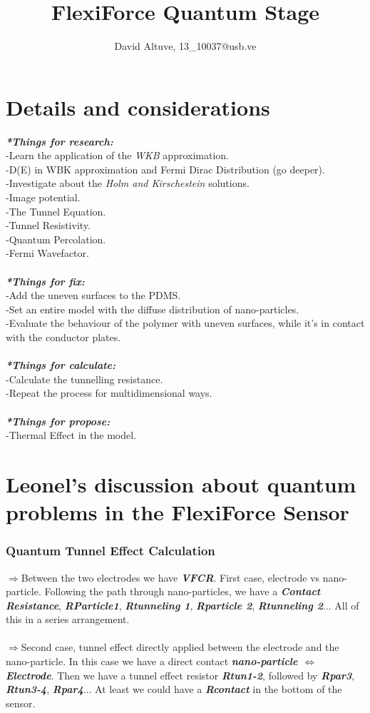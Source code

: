 \documentclass[11pt,a4paper,draft]{article}
\author{David Altuve, 13\_10037@usb.ve}
\title{FlexiForce Quantum Stage}
\begin{document}
\maketitle
\tableofcontents
\part{Details and considerations}
\textbf{\emph{*Things for research:}}\\
-Learn the application of the \emph{WKB} approximation.\\
-D(E) in WBK approximation and Fermi Dirac Distribution (go deeper).\\
-Investigate about the \emph{Holm and Kirschestein} solutions.\\
-Image potential.\\
-The Tunnel Equation.\\
-Tunnel Resistivity.\\
-Quantum Percolation.\\
-Fermi Wavefactor.\\
\\
\textbf{\emph{*Things for fix:}}\\
-Add the uneven surfaces to the PDMS.\\
-Set an entire model with the diffuse distribution of nano-particles.\\
-Evaluate the behaviour of the polymer with uneven surfaces, while it's in contact with the conductor plates.\\
\\
\textbf{\emph{*Things for calculate:}}\\-Calculate the tunnelling resistance.\\
-Repeat the process for multidimensional ways.\\
\\\textbf{\emph{*Things for propose:}}\\
-Thermal Effect in the model.
\part{Leonel's discussion about quantum problems in the FlexiForce Sensor}
\section{Quantum Tunnel Effect Calculation}
$\Rightarrow$Between the two electrodes we have \emph{\textbf{VFCR}}. First case, electrode vs nano-particle. Following the path through nano-particles, we have a \emph{\textbf{Contact Resistance}}, \emph{\textbf{RParticle1}}, \emph{\textbf{Rtunneling 1}}, \emph{\textbf{Rparticle 2}}, \emph{\textbf{Rtunneling 2}}... All of this in a series arrangement.\\
\\$ \Rightarrow $Second case, tunnel effect directly applied between the electrode and the nano-particle. In this case we have a direct contact \emph{\textbf{nano-particle $\Leftrightarrow$ Electrode}}. Then we have a tunnel effect resistor \emph{\textbf{Rtun1-2}}, followed by \emph{\textbf{Rpar3}}, \emph{\textbf{Rtun3-4}}, \emph{\textbf{Rpar4}}... At least we could have a \emph{\textbf{Rcontact}} in the bottom of the sensor. 
\end{document}

